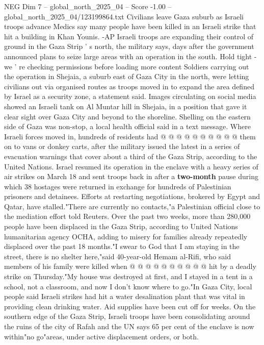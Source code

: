 \begin{textsample}{NEG Dim 7 – global\_north\_2025\_04 – Score -1.00 – global\_north\_2025\_04/123199864.txt}  \label{ex:f7_neg_094}
Civilians leave Gaza suburb as Israeli troops advance Medics say many people have been killed in an Israeli strike that hit a building in Khan Younis. -AP Israeli troops are expanding their control of ground in the Gaza Strip ' s north, the military says, days after the government announced plans to seize large areas with an operation in the south.
Hold tight - we ' re checking permissions before loading more content Soldiers carrying out the operation in Shejaia, a suburb east of Gaza City in the north, were letting civilians out via organised routes as troops moved in to expand the area defined by Israel as a security zone, a statement said.
Images circulating on social media showed an Israeli tank on Al Muntar hill in Shejaia, in a position that gave it clear sight over Gaza City and beyond to the shoreline.
Shelling on the eastern side of Gaza was non-stop, a local health official said in a text message.
Where Israeli forces moved in, hundreds of residents had @ @ @ @ @ @ @ @ @ @ them on to vans or donkey carts, after the military issued the latest in a series of evacuation warnings that cover about a third of the Gaza Strip, according to the United Nations.
Israel resumed its operation in the enclave with a heavy series of air strikes on March 18 and sent troops back in after a \textbf{two-month} pause during which 38 hostages were returned in exchange for hundreds of Palestinian prisoners and detainees.
Efforts at restarting negotiations, brokered by Egypt and Qatar, have stalled."There are currently no contacts,"a Palestinian official close to the mediation effort told Reuters.
Over the past two weeks, more than 280,000 people have been displaced in the Gaza Strip, according to United Nations humanitarian agency OCHA, adding to misery for families already repeatedly displaced over the past 18 months."I swear to God that I am staying in the street, there is no shelter here,"said 40-year-old Hemam al-Rifi, who said members of his family were killed when @ @ @ @ @ @ @ @ @ @ hit by a deadly strike on Thursday."My house was destroyed at first, and I stayed in a tent in a school, not a classroom, and now I don't know where to go."In Gaza City, local people said Israeli strikes had hit a water desalination plant that was vital in providing clean drinking water.
Aid supplies have been cut off for weeks.
On the southern edge of the Gaza Strip, Israeli troops have been consolidating around the ruins of the city of Rafah and the UN says 65 per cent of the enclave is now within"no go"areas, under active displacement orders, or both.

\end{textsample}
